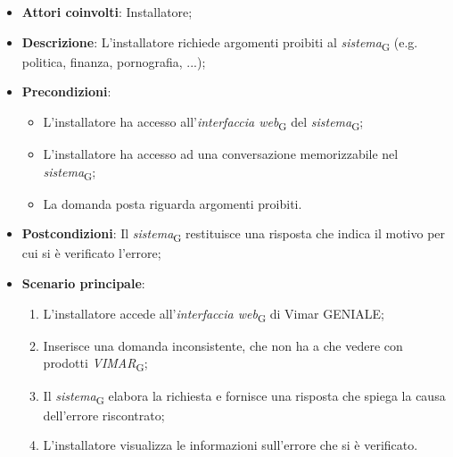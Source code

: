 \begin{itemize}
    \item \textbf{Attori coinvolti}: Installatore;
    \item \textbf{Descrizione}: L’installatore richiede argomenti proibiti al \textit{sistema}\textsubscript{G} (e.g. politica, finanza, pornografia, ...);
    \item \textbf{Precondizioni}: 
    \begin{itemize}
        \item L’installatore ha accesso all’\textit{interfaccia web}\textsubscript{G} del \textit{sistema}\textsubscript{G};
        \item L’installatore ha accesso ad una conversazione memorizzabile nel \textit{sistema}\textsubscript{G};
        \item La domanda posta riguarda argomenti proibiti.
    \end{itemize}
    \item \textbf{Postcondizioni}: Il \textit{sistema}\textsubscript{G} restituisce una risposta che indica il motivo per cui si è verificato l’errore;
    \item \textbf{Scenario principale}:
    \begin{enumerate}
        \item L’installatore accede all’\textit{interfaccia web}\textsubscript{G} di Vimar GENIALE;
        \item Inserisce una domanda inconsistente, che non ha a che vedere con prodotti \textit{VIMAR}\textsubscript{G};
        \item Il \textit{sistema}\textsubscript{G} elabora la richiesta e fornisce una risposta che spiega la causa dell'errore riscontrato;
        \item L’installatore visualizza le informazioni sull’errore che si è verificato.
    \end{enumerate}
\end{itemize}

